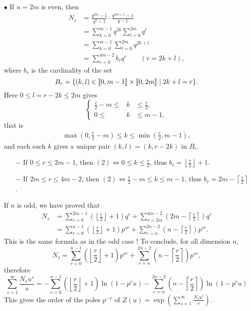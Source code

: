 \documentclass[11pt,a4paper]{article}
\def\gcro{\mbox{[\hspace{-.15em}[}}%
\def\dcro{\mbox{]\hspace{-.15em}]}}
\begin{document}
$\bullet$ If $n = 2m$ is even, then
\begin{align*}
N_s &=\frac{q^{2m}-1}{q^2-1}\cdot  \frac{q^{2m+1}-1}{q-1} \\
&= \sum_{k=0}^{m-1} q^{2k} \sum_{l = 0}^{2m} q^l\\
&=\sum_{k=0}^{m-1} \sum_{l = 0} ^{2m} q^{2k+l}\\
&=\sum_{r=0}^{4m-2} b_r q^r \qquad (r= 2k+l),
\end{align*}
where $b_r$ is the cardinality of the set
$$B_r = \{(k,l) \in \gcro 0, m-1 \dcro \times \gcro 0, 2m \dcro \mid 2k+l = r\}.$$
Here $0 \leq l = r-2k \leq 2m$ gives 
$$
\left\{
\begin{array}{rcl}
\frac{r}{2} - m \leq &k& \leq \frac{r}{2},\\
0 \leq &k& \leq m -1,
\end{array}
\right.
$$
that is
\begin{align}
\max\left( 0,  \frac{r}{2}  - m \right) \leq k \leq \min \left(\frac{r}{2} ,m-1 \right),
\end{align}
 and each such $k$ gives a unique pair $(k,l) = (k,r-2k)$ in $B_r$.
\begin{enumerate}
\item[$-$] If $0 \leq r \leq 2m-1$, then $(2) \iff 0 \leq k \leq \frac{r}{2}$, thus $b_r = \left \lfloor \frac{r}{2} \right \rfloor + 1$.
\item[$-$] If $2m \leq r \leq 4m-2$, then $(2) \iff \frac{r}{2} -m  \leq k \leq m-1$, thus $b_r = 2m - \left \lceil \frac{r}{2} \right \rceil$.
\end{enumerate}
If $n$ is odd, we have proved that
\begin{align*}
N_s &= \sum_{r = 0}^{2m-1}  \left (\left \lfloor \frac{r}{2} \right \rfloor + 1\right) q^r + \sum_{r=2m}^{4m-2} \left ( 2m - \left \lceil \frac{r}{2} \right \rceil \right) q^r\\
&= \sum_{r = 0}^{n-1}  \left (\left \lfloor \frac{r}{2} \right \rfloor + 1\right) p^{sr} + \sum_{r=n}^{2n-2} \left ( n - \left \lceil \frac{r}{2} \right \rceil \right) p^{sr}.
\end{align*}
This is the same formula as in the odd case !
To conclude, for all dimension $n$,
$$N_s = \sum_{r = 0}^{n-1}  \left (\left \lfloor \frac{r}{2} \right \rfloor + 1\right) p^{sr} + \sum_{r=n}^{2n-2} \left ( n - \left \lceil \frac{r}{2} \right \rceil \right) p^{sr},$$
therefore
$$\sum_{s=1}^\infty \frac{N_s u^s}{s} = - \sum_{r=0}^{n-1}  \left (\left \lfloor \frac{r}{2} \right \rfloor + 1 \right) \ln(1-p^ru) - \sum_{r=n}^{2n-2}  \left (n - \left \lceil \frac{r}{2} \right \rceil  \right) \ln(1 - p^r u)$$
This gives the order of the poles $p^{-r}$ of $Z(u) = \exp\left( \sum_{s=1}^\infty \frac{N_s u^s}{s}  \right)$.
\end{document}
